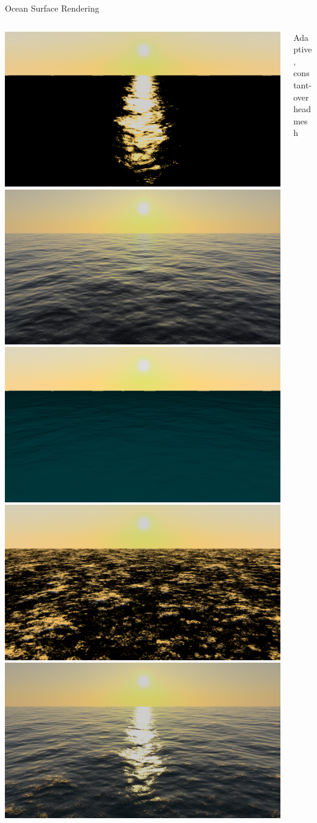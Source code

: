 \documentclass[final,hyperref={pdfpagelabels=true}]{beamer}
\begin{document}
\begin{frame}
\begin{center}
\begin{minipage}{\textwidth}
\begin{block}{Ocean Surface Rendering}
\begin{columns}[t]
\begin{column}{0.75\linewidth}
\begin{center}
					\includegraphics[width=0.225\columnwidth]{figures/28-05-2018_10-56-10_ross}
					\includegraphics[width=0.225\columnwidth]{figures/28-05-2018_10-56-10_sky}\\[0.025\columnwidth]
					\includegraphics[width=0.225\columnwidth]{figures/28-05-2018_10-56-10_sea}	
					\includegraphics[width=0.225\columnwidth]{figures/28-05-2018_10-56-10_whitecaps}	
					\includegraphics[width=0.225\columnwidth]{figures/28-05-2018_10-56-10_complete}	
					\end{center}
				\end{column}
				\begin{column}{0.25\linewidth}
					Adaptive, constant-overhead mesh
					

\end{column}
\end{columns}
\end{block}
\end{minipage}
\end{center}
\end{frame}
\end{document}
